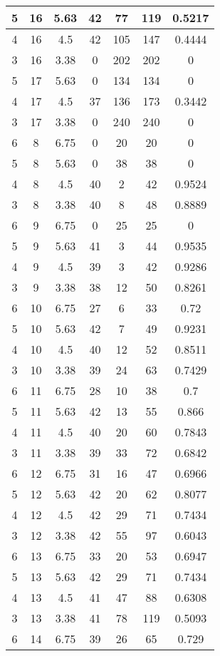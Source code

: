 \documentclass[letterpaper, 12pt]{article}
\begin{document}
\begin{longtable}{|c|c|c|c|c|c|c|}
\hline
5 & 16 & 5.63 & 42 & 77 & 119 & 0.5217 \\
\hline
4 & 16 & 4.5 & 42 & 105 & 147 & 0.4444 \\
\hline
3 & 16 & 3.38 & 0 & 202 & 202 & 0 \\
\hline
5 & 17 & 5.63 & 0 & 134 & 134 & 0 \\
\hline
4 & 17 & 4.5 & 37 & 136 & 173 & 0.3442 \\
\hline
3 & 17 & 3.38 & 0 & 240 & 240 & 0 \\
\hline
6 & 8 & 6.75 & 0 & 20 & 20 & 0 \\
\hline
5 & 8 & 5.63 & 0 & 38 & 38 & 0 \\
\hline
4 & 8 & 4.5 & 40 & 2 & 42 & 0.9524 \\
\hline
3 & 8 & 3.38 & 40 & 8 & 48 & 0.8889 \\
\hline
6 & 9 & 6.75 & 0 & 25 & 25 & 0 \\
\hline
5 & 9 & 5.63 & 41 & 3 & 44 & 0.9535 \\
\hline
4 & 9 & 4.5 & 39 & 3 & 42 & 0.9286 \\
\hline
3 & 9 & 3.38 & 38 & 12 & 50 & 0.8261 \\
\hline
6 & 10 & 6.75 & 27 & 6 & 33 & 0.72 \\
\hline
5 & 10 & 5.63 & 42 & 7 & 49 & 0.9231 \\
\hline
4 & 10 & 4.5 & 40 & 12 & 52 & 0.8511 \\
\hline
3 & 10 & 3.38 & 39 & 24 & 63 & 0.7429 \\
\hline
6 & 11 & 6.75 & 28 & 10 & 38 & 0.7 \\
\hline
5 & 11 & 5.63 & 42 & 13 & 55 & 0.866 \\
\hline
4 & 11 & 4.5 & 40 & 20 & 60 & 0.7843 \\
\hline
3 & 11 & 3.38 & 39 & 33 & 72 & 0.6842 \\
\hline
6 & 12 & 6.75 & 31 & 16 & 47 & 0.6966 \\
\hline
5 & 12 & 5.63 & 42 & 20 & 62 & 0.8077 \\
\hline
4 & 12 & 4.5 & 42 & 29 & 71 & 0.7434 \\
\hline
3 & 12 & 3.38 & 42 & 55 & 97 & 0.6043 \\
\hline
6 & 13 & 6.75 & 33 & 20 & 53 & 0.6947 \\
\hline
5 & 13 & 5.63 & 42 & 29 & 71 & 0.7434 \\
\hline
4 & 13 & 4.5 & 41 & 47 & 88 & 0.6308 \\
\hline
3 & 13 & 3.38 & 41 & 78 & 119 & 0.5093 \\
\hline
6 & 14 & 6.75 & 39 & 26 & 65 & 0.729 \\

\end{longtable}
\end{document}
